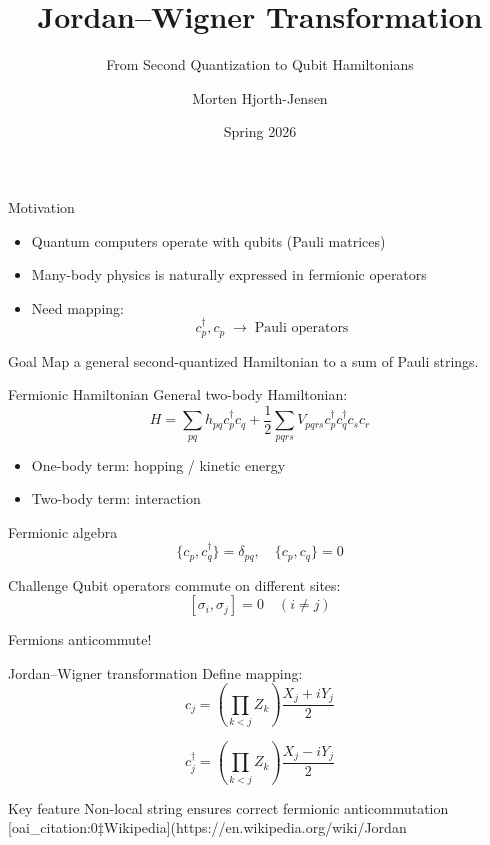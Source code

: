 \documentclass[aspectratio=169]{beamer}
\title{Jordan--Wigner Transformation}
\subtitle{From Second Quantization to Qubit Hamiltonians}
\author{Morten Hjorth-Jensen}
\date{Spring 2026}
\begin{document}
\begin{frame}
\titlepage
\end{frame}

\begin{frame}{Motivation}
\begin{itemize}
\item Quantum computers operate with qubits (Pauli matrices)
\item Many-body physics is naturally expressed in fermionic operators
\item Need mapping:
\[
c^\dagger_p, c_p \;\longrightarrow\; \text{Pauli operators}
\]
\end{itemize}

\begin{block}{Goal}
Map a general second-quantized Hamiltonian to a sum of Pauli strings.
\end{block}
\end{frame}

\begin{frame}{Fermionic Hamiltonian}
General two-body Hamiltonian:
\[
H = \sum_{pq} h_{pq} c^\dagger_p c_q 
+ \frac{1}{2} \sum_{pqrs} V_{pqrs} c^\dagger_p c^\dagger_q c_s c_r
\]

\begin{itemize}
\item One-body term: hopping / kinetic energy
\item Two-body term: interaction
\end{itemize}
\end{frame}

\begin{frame}{Fermionic algebra}
\[
\{c_p, c_q^\dagger\} = \delta_{pq}, \quad
\{c_p, c_q\} = 0
\]

\begin{block}{Challenge}
Qubit operators commute on different sites:
\[
[\sigma_i, \sigma_j] = 0 \quad (i \neq j)
\]

Fermions anticommute!
\end{block}
\end{frame}

\begin{frame}{Jordan--Wigner transformation}
Define mapping:
\[
c_j = \left(\prod_{k<j} Z_k \right) \frac{X_j + i Y_j}{2}
\]

\[
c_j^\dagger = \left(\prod_{k<j} Z_k \right) \frac{X_j - i Y_j}{2}
\]

\begin{block}{Key feature}
Non-local string ensures correct fermionic anticommutation  [oai_citation:0‡Wikipedia](https://en.wikipedia.org/wiki/Jordan%
\end{block}
\end{frame}
\end{document}
